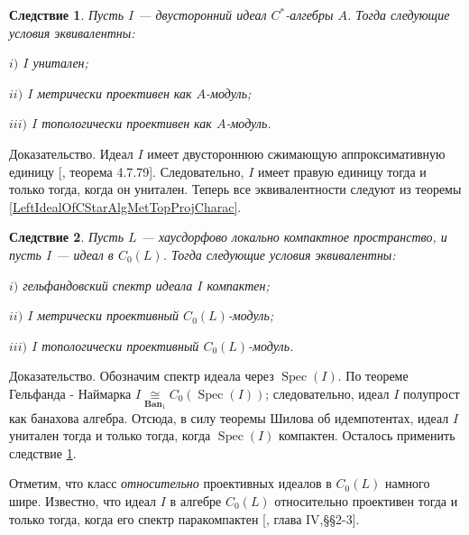 \documentclass[12pt]{article}
\numberwithin{equation}{subsection}
\theoremstyle{plain}
\newtheorem{corollary}{Следствие}
\newenvironment{proof}{Доказательство.}{}
\newcommand{\isom}[1]{\mathop{\mathbin{\cong}}\limits_{#1}}
\begin{document}
\begin{fulltext}
\begin{corollary}\label{BiIdealOfCStarAlgMetTopProjCharac} Пусть $I$ --- двусторонний идеал $C^*$-алгебры $A$. Тогда следующие условия эквивалентны:

$i)$ $I$ унитален;

$ii)$ $I$ метрически проективен как $A$-модуль;

$iii)$ $I$ топологически проективен как $A$-модуль.
\end{corollary}
\begin{proof} Идеал $I$ имеет двустороннюю сжимающую аппроксимативную единицу [\cite{HelBanLocConvAlg}, теорема 4.7.79]. Следовательно, $I$ имеет правую единицу тогда и только тогда, когда он унитален. Теперь все эквивалентности следуют из теоремы \ref{LeftIdealOfCStarAlgMetTopProjCharac}. 
\end{proof}

\begin{corollary}\label{IdealofCommCStarAlgMetTopProjCharac} Пусть $L$ --- хаусдорфово локально компактное пространство, и пусть $I$ --- идеал в $C_0(L)$. Тогда следующие условия эквивалентны:

$i)$ гельфандовский спектр идеала $I$ компактен;

$ii)$ $I$ метрически проективный $C_0(L)$-модуль;

$iii)$ $I$ топологически проективный $C_0(L)$-модуль.
\end{corollary}
\begin{proof} Обозначим спектр идеала через $\operatorname{Spec}(I)$. По теореме Гельфанда - Наймарка $I\isom{\mathbf{Ban}_1}C_0(\operatorname{Spec}(I))$; следовательно, идеал $I$ полупрост как банахова алгебра. Отсюда, в силу теоремы Шилова об идемпотентах, идеал $I$ унитален тогда и только тогда, когда $\operatorname{Spec}(I)$ компактен. Осталось применить следствие \ref{BiIdealOfCStarAlgMetTopProjCharac}. 
\end{proof}

Отметим, что класс \textit{относительно} проективных идеалов в $C_0(L)$ намного шире. Известно, что идеал $I$ в алгебре $C_0(L)$ относительно проективен тогда и только тогда, когда его спектр паракомпактен [\cite{HelHomolBanTopAlg}, глава IV,\S\S 2-3].


\end{fulltext}
\end{document}
